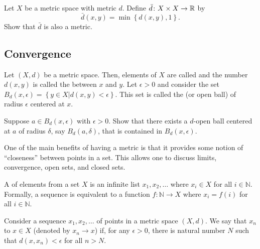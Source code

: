 \begin{problem} \label{problem:StandardBoundedMetric}
Let $X$ be a metric space with metric $d$.
Define $\bar{d}  \colon X \times X \rightarrow \mathbb{R}$ by
\begin{equation*}
\bar{d} (x, y)
= \min \left\{ d (x, y), 1 \right\}.
\end{equation*}
Show that $\bar{d}$ is also a metric.
\end{problem}


\subsection{Convergence}

Let $(X,d)$ be a metric space.
Then, elements of $X$ are called  and the number $d(x,y)$ is called the  between $x$ and $y$.
Let $\epsilon > 0$ and consider the set $B_d(x,\epsilon) = \left\{ y \in X | d(x,y) < \epsilon \right\}$.
This set is called the  (or open ball) of radius $\epsilon$ centered at $x$.

\begin{problem}
Suppose $a \in B_d(x, \epsilon)$ with $\epsilon > 0$.
Show that there exists a $d$-open ball centered at $a$ of radius $\delta$, say $B_d(a, \delta)$, that is contained in $B_d(x, \epsilon)$.
\end{problem}

One of the main benefits of having a metric is that it provides some notion of ``closeness'' between points in a set.
This allows one to discuss limits, convergence, open sets, and closed sets.

\begin{definition}
A  of elements from a set $X$ is an infinite list $x_1,x_2,\ldots$ where $x_i \in X$ for all $i\in \mathbb{N}$.
Formally, a sequence is equivalent to a function $f \colon \mathbb{N} \rightarrow X$ where $x_i = f(i)$ for all $i\in \mathbb{N}$.
\end{definition}

\begin{definition}
\label{definition_metspace_converge}
Consider a sequence $x_1, x_2, \ldots$ of points in a metric space $(X,d)$.
We say that $x_n$  to $x\in X$ (denoted by $x_n \to x$)  if, for any $\epsilon >0$, there is natural number $N$ such that $d(x,x_n) < \epsilon$ for all $n>N$.
\end{definition}

